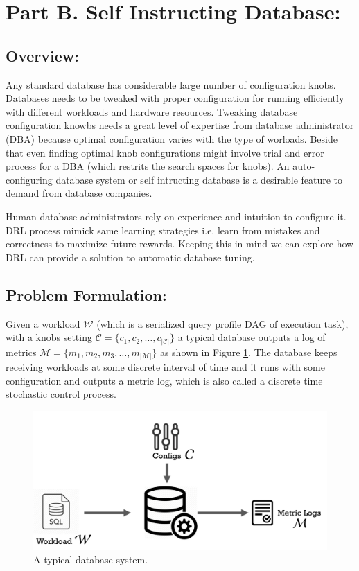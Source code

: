 \section{Part B.  Self Instructing Database:}
\label{part_b}
\subsection{Overview:}
Any standard database has considerable large number of configuration knobs. Databases needs to be tweaked with proper configuration for running efficiently with different workloads and hardware resources. Tweaking database configuration knowbs needs a great level of expertise from database administrator (DBA) because optimal configuration varies with the type of worloads. Beside that even finding optimal knob configurations might involve trial and error process for a DBA (which restrits the search spaces for knobs). An auto-configuring database system or self intructing database is a desirable feature to demand from database companies.


Human database administrators rely on experience and intuition to configure it. DRL process mimick same learning strategies i.e. learn from mistakes and correctness to maximize future rewards. Keeping this in mind we can explore how DRL can provide a solution to automatic database tuning.


\subsection{Problem Formulation:}
Given a workload $\mathcal{W}$ (which is a serialized query profile DAG of execution task), with a knobs setting $\mathcal{C} = \{c_1,c_2,\ldots,c_{|\mathcal{C}|}\}$ a typical database outputs a log of metrics $\mathcal{M} = \{m_1,m_2,m_3,\ldots,m_{|\mathcal{M}|}\}$ as shown in Figure \ref{fig:database_01}.
The database keeps receiving workloads at some discrete interval of time and it runs with some configuration and outputs a metric log, which is also called a discrete time stochastic control process.

\begin{figure}[h]
	\includegraphics[width=0.9\linewidth ]{fig/database_01.png}
    \vspace{-2mm}
    \caption{A typical database system.}
    \label{fig:database_01}
\end{figure}


